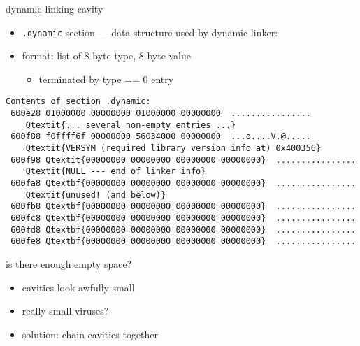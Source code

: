 
\begin{frame}[label=spaceDyn,fragile]{dynamic linking cavity}
\begin{itemize}
\item {\tt .dynamic} section --- data structure used by dynamic linker:
\item format: list of 8-byte type, 8-byte value
    \begin{itemize}
    \item terminated by type == 0 entry
    \end{itemize}
\end{itemize}
\begin{Verbatim}[fontsize=\fontsize{9}{10}\selectfont,commandchars=Q\{\}]
Contents of section .dynamic:
 600e28 01000000 00000000 01000000 00000000  ................
    Qtextit{... several non-empty entries ...}
 600f88 f0ffff6f 00000000 56034000 00000000  ...o....V.@.....
    Qtextit{VERSYM (required library version info at) 0x400356}
 600f98 Qtextit{00000000 00000000 00000000 00000000}  ................
    Qtextit{NULL --- end of linker info}
 600fa8 Qtextbf{00000000 00000000 00000000 00000000}  ................
    Qtextit{unused! (and below)}
 600fb8 Qtextbf{00000000 00000000 00000000 00000000}  ................
 600fc8 Qtextbf{00000000 00000000 00000000 00000000}  ................
 600fd8 Qtextbf{00000000 00000000 00000000 00000000}  ................
 600fe8 Qtextbf{00000000 00000000 00000000 00000000}  ................
\end{Verbatim}
\end{frame}

\begin{frame}{is there enough empty space?}
\begin{itemize}
    \item cavities look awfully small
    \item really small viruses?
    \item solution: chain cavities together
\end{itemize}
\end{frame}


